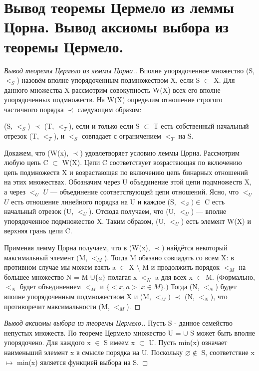 \section{Вывод теоремы Цермело из леммы Цорна. Вывод аксиомы выбора из теоремы Цермело.}

\begin{proof}[Вывод теоремы Цермело из леммы Цорна.]
Вполне упорядоченное множество (S, $<_S$) назовём вполне упорядоченным подмножеством X, если S $\subset$ X. Для данного множества X рассмотрим совокупность W(X) всех его вполне упорядоченных подмножеств. На W(X) определим отношение строгого частичного порядка $\prec$ следующим образом:

\begin{center}
(S, $<_S$) $\prec$ (T, $<_T$), если и только если S $\subset$ T есть собственный начальный отрезок (T, $<_T$), и $<_S$ совпадает с ограничением $<_T$ на S. 
\end{center}

Докажем, что (W(x), $\prec$) удовлетворяет условию леммы Цорна. Рассмотрим любую цепь C $\subset$ W(X).  Цепи C соответствует возрастающая по включению цепь подмножеств X и возрастающая по включению цепь бинарных отношений на этих множествах. Обозначим через U объединение этой цепи подмножеств X, а через $<_U$ $U$ — объединение соответствующей цепи отношений. Ясно, что $<_U$ $U$ есть отношение линейного порядка на U и каждое (S, $<_S) \in$ C есть начальный отрезок (U, $<_U$). Отсюда получаем, что (U, $<_U$) — вполне упорядоченное подмножество X. Таким образом, (U, $<_U$) есть элемент W(X) и верхняя грань цепи C.

Применяя лемму Цорна получаем, что в (W(x), $\prec$) найдётся некоторый максимальный элемент (M, $<_M$). Тогда M обязано совпадать со всем X: в противном случае мы можем взять a $\in$ X $\setminus$ M и продолжить порядок $<_M$ на большее множество N = M $\cup \{ a \}$ полагая x $<_N$ a для всех x $\in$ M.  (Формально, $<_N$ будет объединением $<_M$ и $\{ <x,a> \mid x \in M \}$.) Тогда (N, $<_N$) будет вполне упорядоченным подмножеством X и (M, $<_M$) $\prec$ (N, $<_N$), что противоречит максимальности (M, $<_M$).
\end{proof}

\begin{proof}[Вывод аксиомы выбора из теоремы Цермело.]
Пусть S - данное семейство непустых множеств. По теореме Цермело множество U = $\cup$ S может быть вполне упорядочено. Для каждого  x $\in$ S имеем x $\subset$ U. Пусть min(x) означает наименьший элемент x в смысле порядка на U. Поскольку $\varnothing \notin$ S, соответствие x $\mapsto$ min(x) является функцией выбора на S.
\end{proof}